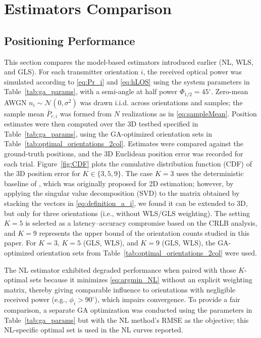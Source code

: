 \documentclass[journal]{IEEEtran}
\begin{document}
\section{Estimators Comparison}
\label{sec:results}

\subsection{Positioning Performance}
\label{subsec:performance}

This section compares the model-based estimators introduced earlier (NL, WLS, and GLS). For each transmitter orientation $i$, the received optical power was simulated according to \eqref{eq:Pr_i} and \eqref{eq:hLOS} using the system parameters in Table~\ref{tab:ga_params}, with a semi-angle at half power $\Phi_{1/2}=45^\circ$. Zero-mean AWGN $n_i\!\sim\!\mathcal{N}(0,\sigma^2)$ was drawn i.i.d. across orientations and samples; the sample mean $\bar P_{r,i}$ was formed from $N$ realizations as in \eqref{eq:sampleMean}. Position estimates were then computed over the 3D testbed specified in Table~\ref{tab:ga_params}, using the GA-optimized orientation sets in Table~\ref{tab:optimal_orientations_2col}. Estimates were compared against the ground-truth positions, and the 3D Euclidean position error was recorded for each trial. Figure~\ref{fig:CDF} plots the cumulative distribution function (CDF) of the 3D position error for \(K\in\{3,5,9\}\). The case \(K=3\) uses the deterministic baseline of \cite{Chassagne2025}, which was originally proposed for 2D estimation; however, by applying the singular value decomposition (SVD) to the matrix obtained by stacking the vectors in \eqref{eq:definition_a_i}, we found it can be extended to 3D, but only for three orientations (i.e., without WLS/GLS weighting).
The setting \(K=5\) is selected as a latency–accuracy compromise based on the CRLB analysis, and \(K=9\) represents the upper bound of the orientation counts studied in this paper. For \(K=3\), \(K=5\) (GLS, WLS), and \(K=9\) (GLS, WLS), the GA-optimized orientation sets from Table~\ref{tab:optimal_orientations_2col} were used.

The NL estimator exhibited degraded performance when paired with those \(K\)-optimal sets because it minimizes \eqref{eq:argmin_NL} without an explicit weighting matrix, thereby giving comparable influence to orientations with negligible received power (e.g., \(\phi_i>90^\circ\)), which impairs convergence. To provide a fair comparison, a separate GA optimization was conducted using the parameters in Table~\ref{tab:ga_params} but with the NL method’s RMSE as the objective; this NL-specific optimal set is used in the NL curves reported.
\end{document}
